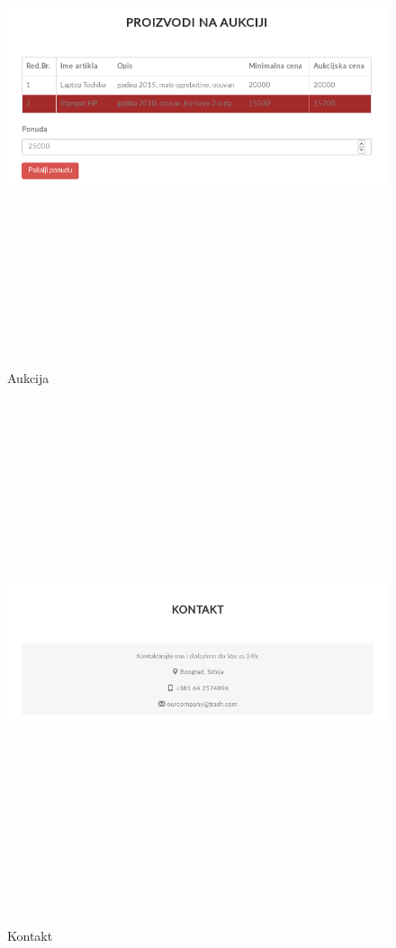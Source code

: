 \documentclass[10 pt]{article}
\begin{document}
		
		\begin{figure}[H]
			\centering
			\includegraphics[width=15cm,height=15cm,keepaspectratio]{GUI/Aukcija.png}\\
			\caption{Aukcija}
			\label{fig:aukcija}
		\end{figure}
	
		
		\begin{figure}[H]
			\centering
			\includegraphics[width=15cm,height=15cm,keepaspectratio]{GUI/kontaktDeo.png}\\
			\caption{Kontakt}
			\label{fig:kontakt}
		\end{figure}
	
\end{document}
